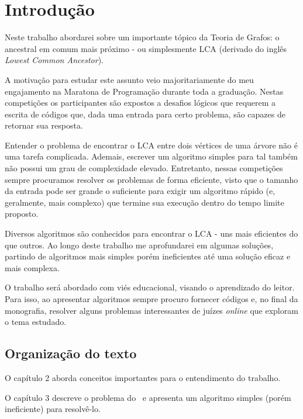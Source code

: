 \chapter{Introdução}
\label{cap:introducao}


Neste trabalho abordarei sobre um importante tópico da Teoria de Grafos: o ancestral 
em comum mais próximo - ou simplesmente LCA (derivado do inglês \emph{Lowest Common 
Ancestor}).

A motivação para estudar este assunto \cite{top-coder} veio majoritariamente do meu engajamento na 
Maratona de Programação durante toda a graduação. Nestas competições os participantes 
são expostos a desafios lógicos que requerem a escrita de códigos que, dada uma 
entrada para certo problema, são capazes de retornar sua resposta.

Entender o problema de encontrar o LCA entre dois vértices de uma árvore não é uma 
tarefa complicada. Ademais, escrever um algoritmo simples para tal também não possui 
um grau de complexidade elevado. Entretanto, nessas competições sempre procuramos 
resolver os problemas de forma eficiente, visto que o tamanho da entrada pode ser 
grande o suficiente para exigir um algoritmo rápido (e, geralmente, mais complexo) 
que termine sua execução dentro do tempo limite proposto.

Diversos algoritmos são conhecidos para encontrar o LCA - uns mais eficientes do 
que outros. Ao longo deste trabalho me aprofundarei em algumas soluções, partindo 
de algoritmos mais simples porém ineficientes até uma solução eficaz e mais complexa.

O trabalho será abordado com viés educacional, visando o aprendizado do leitor. 
Para isso, ao apresentar algoritmos sempre procuro fornecer códigos e, no final da
monografia, resolver alguns problemas interessantes de juízes \emph{online} que 
exploram o tema estudado.


\section{Organização do texto}

O capítulo 2 aborda conceitos importantes para o entendimento do trabalho.

\vspace{0.2cm}

O capítulo 3 descreve o problema do \LCA\ e apresenta um algoritmo simples (porém ineficiente) para resolvê-lo.

